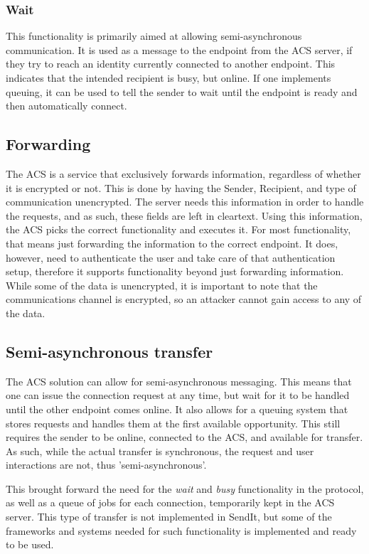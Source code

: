 	\subsubsection*{Wait}
	This functionality is primarily aimed at allowing semi-asynchronous communication. It is used as a message to the endpoint from the ACS server, if they try to reach an identity currently connected to another endpoint. This indicates that the intended recipient is busy, but online. If one implements queuing, it can be used to tell the sender to wait until the endpoint is ready and then automatically connect.
%
	\subsection{Forwarding}
	The ACS is a service that exclusively forwards information, regardless of whether it is encrypted or not. This is done by having the Sender, Recipient, and type of communication unencrypted. The server needs this information in order to handle the requests, and as such, these fields are left in cleartext. Using this information, the ACS picks the correct functionality and executes it. For most functionality, that means just forwarding the information to the correct endpoint. It does, however, need to authenticate the user and take care of that authentication setup, therefore it supports functionality beyond just forwarding information. While some of the data is unencrypted, it is important to note that the communications channel is encrypted, so an attacker cannot gain access to any of the data.
	
	\subsection{Semi-asynchronous transfer}
	The ACS solution can allow for semi-asynchronous messaging. This means that one can issue the connection request at any time, but wait for it to be handled until the other endpoint comes online. It also allows for a queuing system that stores requests and handles them at the first available opportunity. This still requires the sender to be online, connected to the ACS, and available for transfer. As such, while the actual transfer is synchronous, the request and user interactions are not, thus 'semi-asynchronous'.

	This brought forward the need for the \emph{wait} and \emph{busy} functionality in the protocol, as well as a queue of jobs for each connection, temporarily kept in the ACS server. This type of transfer is not implemented in SendIt, but some of the frameworks and systems needed for such functionality is implemented and ready to be used.